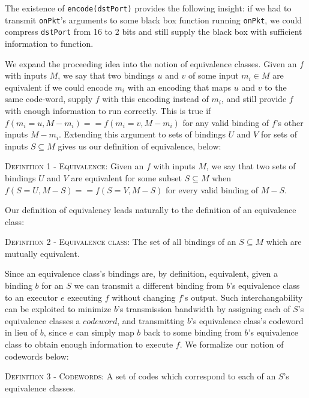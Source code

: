 The existence of \texttt{encode(dstPort)} provides the following insight: if we had to transmit \texttt{onPkt}'s arguments to some black box function running \texttt{onPkt}, we could compress \texttt{dstPort} from 16 to 2 bits and still supply the black box with sufficient information to function.

 We expand the proceeding idea into the notion of equivalence classes. Given an $f$ with inputs $M$, we say that two bindings $u$ and $v$ of some input $m_i \in M$ are equivalent if we could encode $m_i$ with an encoding that maps $u$ and $v$ to the same code-word, supply $f$ with this encoding instead of $m_i$, and still provide $f$ with enough information to run correctly. This is true if $f(m_i = u, M - m_i) == f(m_i = v, M - m_i)$ for any valid binding of $f$'s other inputs $M - m_i$. Extending this argument to sets of bindings $U$ and $V$ for sets of inputs $S \subseteq M$ gives us our definition of equivalence, below:

\vspace{1mm}
\noindent \textsc{Definition 1 - Equivalence:} Given an $f$ with inputs $M$, we say that two sets of bindings $U$ and $V$ are equivalent for some subset $S \subseteq M$ when $f(S = U, M - S) == f(S = V, M - S)$ for every valid binding of $M - S$.
\vspace{1mm}

Our definition of equivalency leads naturally to the definition of an equivalence class:

\vspace{1mm}
\noindent \textsc{Definition 2 - Equivalence class:} The set of all bindings of an $S \subseteq M$ which are mutually equivalent.
\vspace{1mm}

 Since an equivalence class's bindings are, by definition, equivalent, given a binding $b$ for an $S$ we can transmit a different binding from $b$'s equivalence class to an executor $e$ executing $f$ without changing $f$'s output. Such interchangability can be exploited to minimize $b$'s transmission bandwidth by assigning each of $S$'s equivalence classes a $codeword$, and transmitting $b$'s equivalence class's codeword in lieu of $b$, since $e$ can simply map $b$ back to some binding from $b$'s equivalence class to obtain enough information to execute $f$. We formalize our notion of codewords below:
\vspace{1mm}

\textsc{Definition 3 - Codewords:} A set of codes which correspond to each of an $S$'s equivalence classes.
\vspace{1mm}

